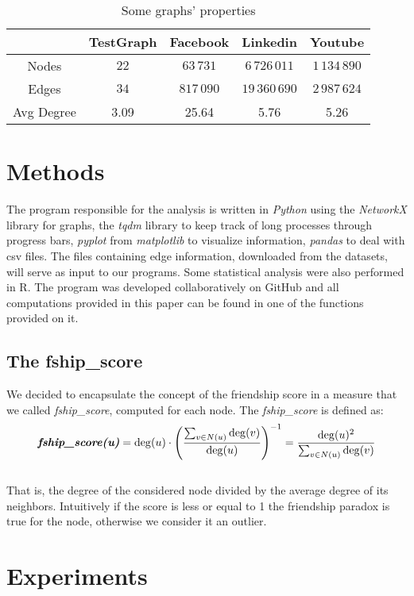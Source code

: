 \documentclass{article}
\begin{document}
\begin{table}[ht]
\centering
\begin{tabular}{|c|c|c|c|c|}
\hline
& TestGraph & Facebook & Linkedin & Youtube \\ \hline
Nodes & $22$ & $63\,731$ & $6\,726\,011$ & $1\,134\,890$\\ \hline
Edges & $34$ & $817\,090$ & $19\,360\,690$ & $2\,987\,624$ \\ \hline
Avg Degree & 3.09 & 25.64 &  5.76 & 5.26 \\ \hline 
\end{tabular}
\caption{Some graphs' properties}
\end{table} 

\section{Methods}
The program responsible for the analysis is written in \textit{Python} using the \textit{NetworkX} library for graphs, the \textit{tqdm} library to keep track of long processes through progress bars, \textit{pyplot} from \textit{matplotlib} to visualize information, \textit{pandas} to deal with csv files. The files containing edge information, downloaded from the datasets, will serve as input to our programs. Some statistical analysis were also performed in R.
The program was developed collaboratively on GitHub\cite{Github_repo} and all computations provided in this paper can be found in one of the functions provided on it.

\subsection{The fship\_score}
We decided to encapsulate the concept of the friendship score in a measure that we called \textit{fship\_score}, computed for each node. 
The \textit{fship\_score} is defined as:
\\\[
\textit{\textbf{fship\_score(u)}} = \deg(u) \cdot \left( \frac{\sum_{v \in N(u)} \deg(v)}{\deg(u)} \right)^{-1} =
\frac{\deg(u)^{2}}{\sum_{v \in N(u)} \deg(v)}
\]\\
That is, the degree of the considered node divided by the average degree of its neighbors. Intuitively if the score is less or equal to 1 the friendship paradox is true for the node, otherwise we consider it an outlier.


\section{Experiments}
\end{document}
